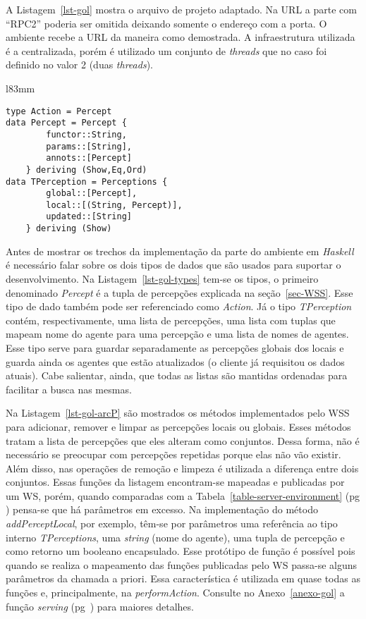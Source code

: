 A Listagem~\ref{lst-gol} mostra o arquivo de projeto adaptado. Na URL a parte
com ``RPC2'' poderia ser omitida deixando somente o endereço com a porta. O
ambiente recebe a URL da maneira como demostrada. A infraestrutura utilizada é
a centralizada, porém é utilizado um conjunto de \emph{threads} que no caso
foi definido no valor 2 (duas \emph{threads}).

\lstset{linewidth=73mm}
\begin{wrapfigure}{l}{83mm}
    \begin{minipage}{73mm}
	\begin{lstlisting}[frame=trbl, caption=Tipos usados pelo ambiente.,label=lst-gol-types]
type Action = Percept
data Percept = Percept {
        functor::String,
        params::[String],
        annots::[Percept]
    } deriving (Show,Eq,Ord)
data TPerception = Perceptions {
        global::[Percept],
        local::[(String, Percept)],
        updated::[String]
    } deriving (Show)
	\end{lstlisting}
    \end{minipage}
\end{wrapfigure}

Antes de mostrar os trechos da implementação da parte do ambiente em
\emph{Haskell} é necessário falar sobre os dois tipos de dados que são usados para
suportar o desenvolvimento. Na Listagem~\ref{lst-gol-types} tem-se os tipos, o
primeiro denominado \emph{Percept} é a tupla de percepções explicada na
seção~\ref{sec-WSS}. Esse tipo de dado também pode ser referenciado como
\emph{Action}. Já o tipo \emph{TPerception} contém, respectivamente,
uma lista de percepções, uma lista com tuplas que mapeam nome do agente para uma
percepção e uma lista de nomes de agentes. Esse tipo serve para guardar
separadamente as percepções globais dos locais e guarda ainda os agentes que
estão atualizados (o cliente já requisitou os dados atuais). Cabe salientar,
ainda, que todas as listas são mantidas ordenadas para facilitar a busca
nas mesmas.

Na Listagem~\ref{lst-gol-arcP} são mostrados os métodos implementados pelo WSS
para adicionar, remover e limpar as percepções locais ou globais.
Esses métodos tratam a lista de
percepções que eles alteram como conjuntos. Dessa forma, não é necessário se
preocupar com percepções repetidas porque elas não vão existir. Além disso,
nas operações de remoção e limpeza é utilizada a
diferença entre dois conjuntos. Essas funções da listagem encontram-se
mapeadas e publicadas por um WS, porém, quando comparadas com a
Tabela~\ref{table-server-environment} (pg \pageref{table-server-environment})
pensa-se que há parâmetros em excesso. Na implementação do método
\emph{addPerceptLocal}, por exemplo, têm-se por parâmetros uma referência ao
tipo interno \emph{TPerceptions}, uma \emph{string} (nome do agente), uma
tupla de percepção e como retorno um booleano encapsulado. Esse protótipo de
função é possível pois quando se realiza o mapeamento das funções publicadas
pelo WS passa-se alguns parâmetros da chamada a priori.
Essa característica é utilizada em quase todas as funções e,
principalmente, na \emph{performAction}. Consulte no Anexo~\ref{anexo-gol} a
função \emph{serving} (pg~\pageref{anexo-gol-endLuccaWS}) para maiores
detalhes.

